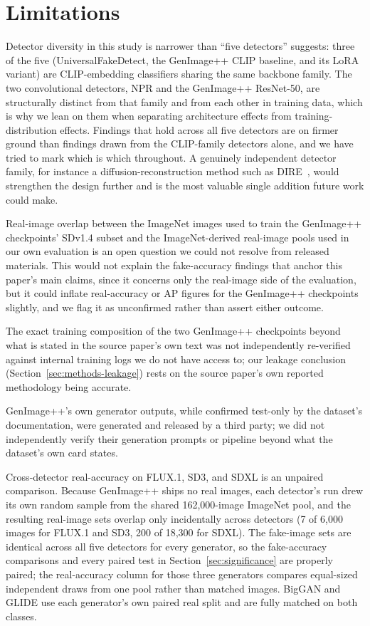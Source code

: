 \documentclass[3p,times,procedia]{elsarticle}
\begin{document}
\section{Limitations}
\label{sec:limitations}

Detector diversity in this study is narrower than ``five detectors''
suggests: three of the five (UniversalFakeDetect, the GenImage++ CLIP
baseline, and its LoRA variant) are CLIP-embedding classifiers sharing the
same backbone family. The two convolutional detectors, NPR and the
GenImage++ ResNet-50, are structurally distinct from that family and from
each other in training data, which is why we lean on them when separating
architecture effects from training-distribution effects. Findings that
hold across all five detectors are on firmer ground than findings drawn
from the CLIP-family detectors alone, and we have tried to mark which is
which throughout. A genuinely independent detector family, for instance a
diffusion-reconstruction method such as DIRE~\cite{wang2023dire}, would
strengthen the design further and is the most valuable single addition
future work could make.

Real-image overlap between the ImageNet images used to train the
GenImage++ checkpoints' SDv1.4 subset and the ImageNet-derived real-image
pools used in our own evaluation is an open question we could not resolve
from released materials. This would not explain the fake-accuracy findings
that anchor this paper's main claims, since it concerns only the real-image
side of the evaluation, but it could inflate real-accuracy or AP figures
for the GenImage++ checkpoints slightly, and we flag it as unconfirmed
rather than assert either outcome.

The exact training composition of the two GenImage++ checkpoints beyond
what is stated in the source paper's own text was not independently
re-verified against internal training logs we do not have access to; our
leakage conclusion (Section~\ref{sec:methods-leakage}) rests on the source
paper's own reported methodology being accurate.

GenImage++'s own generator outputs, while confirmed test-only by the
dataset's documentation, were generated and released by a third party; we
did not independently verify their generation prompts or pipeline beyond
what the dataset's own card states.

Cross-detector real-accuracy on FLUX.1, SD3, and SDXL is an unpaired
comparison. Because GenImage++ ships no real images, each detector's run
drew its own random sample from the shared 162{,}000-image ImageNet pool,
and the resulting real-image sets overlap only incidentally across
detectors (7 of 6{,}000 images for FLUX.1 and SD3, 200 of 18{,}300 for
SDXL). The fake-image sets are identical across all five detectors for
every generator, so the fake-accuracy comparisons and every paired test in
Section~\ref{sec:significance} are properly paired; the real-accuracy
column for those three generators compares equal-sized independent draws
from one pool rather than matched images. BigGAN and GLIDE use each
generator's own paired real split and are fully matched on both classes.
\end{document}
